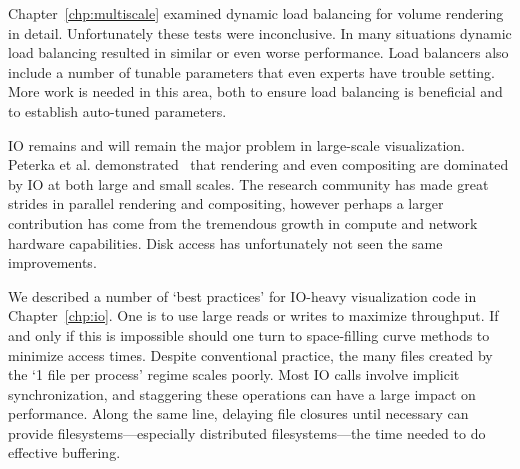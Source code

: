 Chapter~\ref{chp:multiscale} examined dynamic load balancing for volume
rendering in detail.  Unfortunately these tests were inconclusive.  In
many situations dynamic load balancing resulted in similar or even
worse performance.  Load balancers also include a number of tunable
parameters that even experts have trouble setting.  More work is needed
in this area, both to ensure load balancing is beneficial and to
establish auto-tuned parameters.






IO remains and will remain the major problem in large-scale
visualization.  Peterka et al. demonstrated~\cite{Peterka:2009:ETES}
that rendering and even compositing are dominated by IO at both large
and small scales.  The research community has made great strides
in parallel rendering and compositing, however perhaps a larger
contribution has come from the tremendous growth in compute and network
hardware capabilities.  Disk access has unfortunately not seen the same
improvements.

We described a number of `best practices' for IO-heavy visualization
code in Chapter~\ref{chp:io}.  One is to use large reads or writes
to maximize throughput.  If and only if this is impossible should
one turn to space-filling curve methods to minimize access times.
Despite conventional practice, the many files created by the `1 file
per process' regime scales poorly.  Most IO calls involve implicit
synchronization, and staggering these operations can have a large
impact on performance.  Along the same line, delaying file closures
until necessary can provide filesystems---especially distributed
filesystems---the time needed to do effective buffering.


